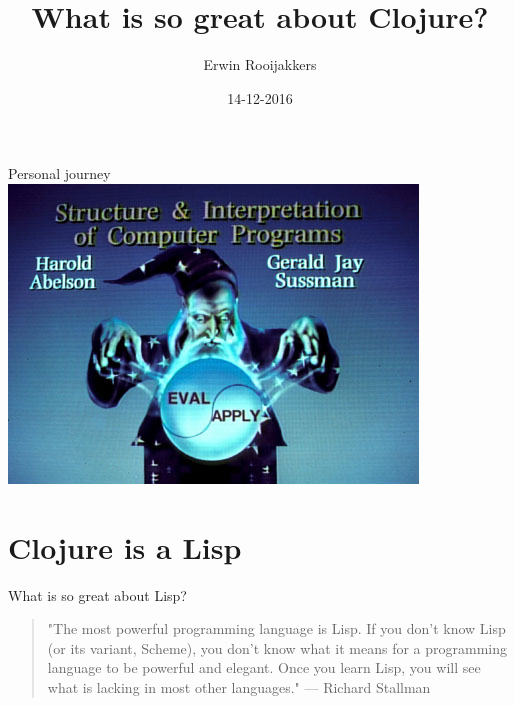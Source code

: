 \documentclass[presentation]{beamer}
\author{Erwin Rooijakkers}
\date{14-12-2016}
\title{What is so great about Clojure?}
\begin{document}
\maketitle

\begin{frame}[label=sec-0-1]{Personal journey}
\includegraphics[width=.9\linewidth]{../images/wizard.jpg}
\end{frame}

\section{Clojure is a Lisp}
\label{sec-1}

\begin{frame}[label=sec-1-1]{What is so great about Lisp?}
\begin{quotation}
"The most powerful programming language is Lisp. If you don't know Lisp (or its variant, Scheme), you don't know what it means for a programming language to be powerful and elegant. Once you learn Lisp, you will see what is lacking in most other languages." --- Richard Stallman
\end{quotation}
\end{frame}
\end{document}

